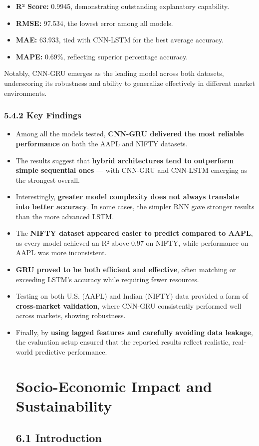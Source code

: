 \documentclass[12pt,a4paper]{report}
\begin{document}
\begin{itemize}
  \item \textbf{R² Score:} 0.9945, demonstrating outstanding explanatory capability.
  \item \textbf{RMSE:} 97.534, the lowest error among all models.
  \item \textbf{MAE:} 63.933, tied with CNN-LSTM for the best average accuracy.
  \item \textbf{MAPE:} 0.69\%, reflecting superior percentage accuracy.
\end{itemize}

Notably, CNN-GRU emerges as the leading model across both datasets, underscoring its robustness and ability to generalize effectively in different market environments.

\subsection{5.4.2 Key Findings}
\begin{itemize}
  \item Among all the models tested, \textbf{CNN-GRU delivered the most reliable performance} on both the AAPL and NIFTY datasets.
  \item The results suggest that \textbf{hybrid architectures tend to outperform simple sequential ones} — with CNN-GRU and CNN-LSTM emerging as the strongest overall.
  \item Interestingly, \textbf{greater model complexity does not always translate into better accuracy}. In some cases, the simpler RNN gave stronger results than the more advanced LSTM.
  \item The \textbf{NIFTY dataset appeared easier to predict compared to AAPL}, as every model achieved an R² above 0.97 on NIFTY, while performance on AAPL was more inconsistent.
  \item \textbf{GRU proved to be both efficient and effective}, often matching or exceeding LSTM’s accuracy while requiring fewer resources.
  \item Testing on both U.S. (AAPL) and Indian (NIFTY) data provided a form of \textbf{cross-market validation}, where CNN-GRU consistently performed well across markets, showing robustness.
  \item Finally, by \textbf{using lagged features and carefully avoiding data leakage}, the evaluation setup ensured that the reported results reflect realistic, real-world predictive performance.
\chapter{Socio-Economic Impact and Sustainability}
\label{ch:6}
\section{6.1 Introduction}
\end{itemize}
\end{document}
